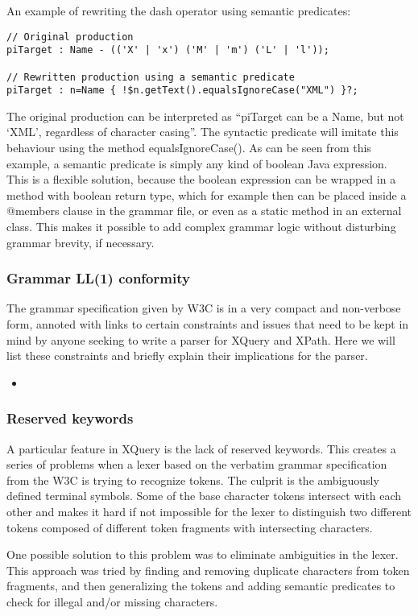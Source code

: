 An example of rewriting the dash operator using semantic predicates:
\begin{verbatim}
// Original production
piTarget : Name - (('X' | 'x') ('M' | 'm') ('L' | 'l'));

// Rewritten production using a semantic predicate
piTarget : n=Name { !$n.getText().equalsIgnoreCase("XML") }?;
\end{verbatim}
The original production can be interpreted as ``piTarget can be a Name, but not
`XML', regardless of character casing''. The syntactic predicate will imitate
this behaviour using the method equalsIgnoreCase(). As can be seen from this
example, a semantic predicate is simply any kind of boolean Java expression.
This is a flexible solution, because the boolean expression can be wrapped in a
method with boolean return type, which for example then can be placed inside a
@members { } clause in the grammar file, or even as a static method in an
external class. This makes it possible to add complex grammar logic without
disturbing grammar brevity, if necessary.

\subsubsection{Grammar LL(1) conformity}
The grammar specification given by W3C is in a very compact and non-verbose
form, annoted with links to certain constraints and issues that need to be kept
in mind by anyone seeking to write a parser for XQuery and XPath. Here we will
list these constraints and briefly explain their implications for the parser.

\begin{itemize}
  \item 
\end{itemize}

\subsubsection{Reserved keywords}
A particular feature in XQuery is the lack of reserved keywords. This creates a
series of problems when a lexer based on the verbatim grammar specification from
the W3C is trying to recognize tokens. The culprit is the ambiguously defined
terminal symbols. Some of the base character tokens intersect with each other
and makes it hard if not impossible for the lexer to distinguish two different
tokens composed of different token fragments with intersecting characters.

One possible solution to this problem was to eliminate ambiguities in the lexer.
This approach was tried by finding and removing duplicate characters from token
fragments, and then generalizing the tokens and adding semantic predicates to
check for illegal and/or missing characters.

